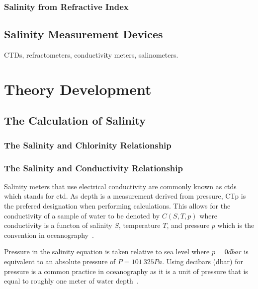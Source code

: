 \subsection{Salinity from Refractive Index}

\section{Salinity Measurement Devices}\label{sec:salinity-measurement-devices}
CTDs, refractometers, conductivity meters, salinometers.


\chapter{Theory Development}\label{ch:theory-development}

\section{The Calculation of Salinity}\label{sec:the-calculation-of-salinity}

\subsection{The Salinity and Chlorinity Relationship}\label{subsec:the-salinity-chlorinity-relationship}

\subsection{The Salinity and Conductivity Relationship}\label{subsec:the-salinity-conductivity-relationship}

Salinity meters that use electrical conductivity are commonly known as \gls{ctd}s which stands for \gls{ctd}.
As depth is a measurement derived from pressure, CTp is the prefered designation when performing calculations.
This allows for the conductivity of a sample of water to be denoted by $C(S, T, p)$ where conductivity is a functon of salinity $S$, temperature $T$, and pressure $p$ which is the convention in oceanography~\cite{lewis_salinity_definition_and_calculation_1978}.

Pressure in the salinity equation is taken relative to sea level where $p = 0 dbar$ is equivalent to an absolute pressure of $P = 101\ 325 Pa$.
Using decibars (dbar) for pressure is a common practice in oceanography as it is a unit of pressure that is equal to roughly one meter of water depth~\cite{seabird_dbar_to_depth_2024}.

